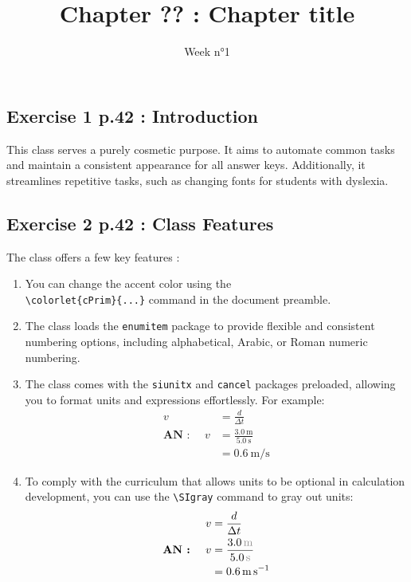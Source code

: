 \documentclass[code]{HSP-AnswerSheet}
\title{Chapter ?? : Chapter title}
\date{Week n°1}
\begin{document}
	\maketitle
	
	\begin{multicols*}{2}
		
		\subsection*{Exercise 1 p.42 : Introduction}
		This class serves a purely cosmetic purpose. It aims to automate common tasks and maintain a consistent appearance for all answer keys. Additionally, it streamlines repetitive tasks, such as changing fonts for students with dyslexia.
		
		\subsection*{Exercise 2 p.42 : Class Features}
		The class offers a few key features :
		\begin{enumerate}[label=\bfseries\alph*.]
			\item You can change the accent color using the \\ \verb|\colorlet{cPrim}{...}| command in the document preamble.
			\item The class loads the \verb|enumitem| package to provide flexible and consistent numbering options, including alphabetical, Arabic, or Roman numeric numbering.
			\item The class comes with the \verb|siunitx| and \verb|cancel| packages preloaded, allowing you to format units and expressions effortlessly. For example:
			\begin{align*}
				v&=\frac{d}{\Delta t}\\
					\textbf{AN : }\quad
				v&=\frac{ \SI{3.0}{\meter} }{ \SI{5.0}{\second} }\\
				 &=\SI{0.6}{\meter\per\second}
			\end{align*}
		
			\item To comply with the curriculum that allows units to be optional in calculation development, you can use the \verb|\SIgray| command to gray out units:
			\begin{align*}
				v&=\frac{d}{\Delta t}\\
				\textbf{AN : }\quad
				v&=\frac{ \SIgray{3.0}{\meter} }{ \SIgray{5.0}{\second} }\\
				&=\SI{0.6}{\meter\per\second}
			\end{align*}
		\end{enumerate}
		

\end{multicols*}
\end{document}
